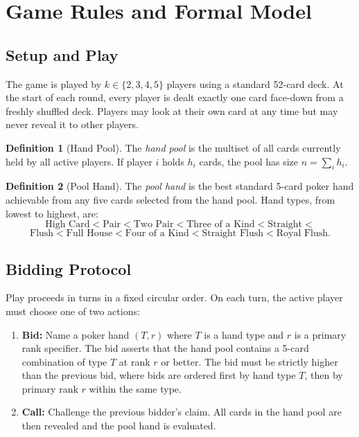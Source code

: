 \documentclass[11pt, a4paper]{article}
\theoremstyle{definition}
\newtheorem{definition}{Definition}
\begin{document}
\section{Game Rules and Formal Model}
\label{sec:rules}

\subsection{Setup and Play}

The game is played by $k \in \{2, 3, 4, 5\}$ players using a standard 52-card deck.
At the start of each round, every player is dealt exactly one card face-down from a
freshly shuffled deck. Players may look at their own card at any time but may never
reveal it to other players.

\begin{definition}[Hand Pool]
The \emph{hand pool} is the multiset of all cards currently held by all active players.
If player $i$ holds $h_i$ cards, the pool has size $n = \sum_i h_i$.
\end{definition}

\begin{definition}[Pool Hand]
The \emph{pool hand} is the best standard 5-card poker hand achievable from any five
cards selected from the hand pool. Hand types, from lowest to highest, are:
\[
\text{High Card} < \text{Pair} < \text{Two Pair} < \text{Three of a Kind} < \text{Straight}<\]
\[ \text{Flush} < \text{Full House} < \text{Four of a Kind} < \text{Straight Flush} < \text{Royal Flush.}
\]
\end{definition}

\subsection{Bidding Protocol}

Play proceeds in turns in a fixed circular order. On each turn, the active player must
choose one of two actions:

\begin{enumerate}
    \item \textbf{Bid:} Name a poker hand $(T, r)$ where $T$ is a hand type and $r$ is
          a primary rank specifier. The bid asserts that the hand pool contains a
          5-card combination of type $T$ at rank $r$ or better. The bid must be
          strictly higher than the previous bid, where bids are ordered first by hand
          type $T$, then by primary rank $r$ within the same type.
    \item \textbf{Call:} Challenge the previous bidder's claim.
          All cards in the hand pool are then revealed and the pool hand is evaluated.
\end{enumerate}
\end{document}
